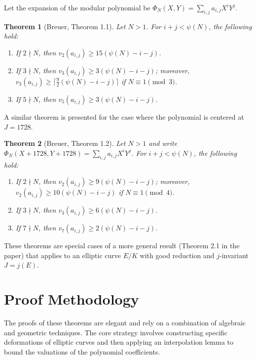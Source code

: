 \documentclass[12pt, a4paper]{article}
\theoremstyle{plain}
\newtheorem{theorem}{Theorem}[section]
\theoremstyle{definition}
\begin{document}
Let the expansion of the modular polynomial be $\Phi_N(X,Y) = \sum_{i,j} a_{i,j} X^i Y^j$.

\begin{theorem}[Breuer, Theorem 1.1]
    Let $N > 1$. For $i+j < \psi(N)$, the following hold:
    \begin{enumerate}
        \item If $2 \nmid N$, then $v_2(a_{i,j}) \geq 15(\psi(N) - i - j)$.
        \item If $3 \nmid N$, then $v_3(a_{i,j}) \geq 3(\psi(N) - i - j)$; moreover, $v_3(a_{i,j}) \geq \lceil\frac{9}{2}(\psi(N)-i-j)\rceil$ if $N \equiv 1 \pmod 3$.
        \item If $5 \nmid N$, then $v_5(a_{i,j}) \geq 3(\psi(N) - i - j)$.
    \end{enumerate}
\end{theorem}

A similar theorem is presented for the case where the polynomial is centered at $J=1728$.

\begin{theorem}[Breuer, Theorem 1.2]
    Let $N > 1$ and write $\Phi_N(X+1728, Y+1728) = \sum_{i,j} a_{i,j} X^i Y^j$. For $i+j < \psi(N)$, the following hold:
    \begin{enumerate}
        \item If $2 \nmid N$, then $v_2(a_{i,j}) \geq 9(\psi(N) - i - j)$; moreover, $v_2(a_{i,j}) \geq 10(\psi(N)-i-j)$ if $N \equiv 1 \pmod 4$.
        \item If $3 \nmid N$, then $v_3(a_{i,j}) \geq 6(\psi(N) - i - j)$.
        \item If $7 \nmid N$, then $v_7(a_{i,j}) \geq 2(\psi(N) - i - j)$.
    \end{enumerate}
\end{theorem}

These theorems are special cases of a more general result (Theorem 2.1 in the paper) that applies to an elliptic curve $E/K$ with good reduction and $j$-invariant $J=j(E)$.

\section{Proof Methodology}

The proofs of these theorems are elegant and rely on a combination of algebraic and geometric techniques. The core strategy involves constructing specific deformations of elliptic curves and then applying an interpolation lemma to bound the valuations of the polynomial coefficients.
\end{document}
